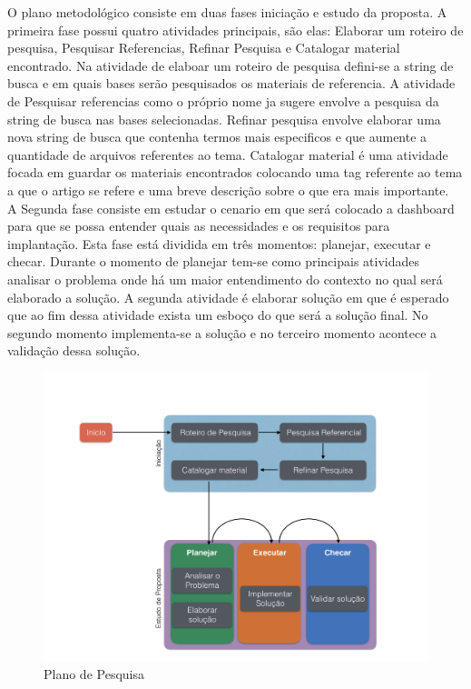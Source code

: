 O plano metodológico consiste em duas fases iniciação e estudo da proposta. A primeira fase possui quatro atividades principais, são elas: Elaborar um roteiro de pesquisa, Pesquisar Referencias, Refinar Pesquisa e Catalogar material encontrado. Na atividade de elaboar um roteiro de pesquisa defini-se a string de busca e em quais bases serão pesquisados os materiais de referencia. A atividade de Pesquisar referencias como o próprio nome ja sugere envolve a pesquisa da string de busca nas bases selecionadas. Refinar pesquisa envolve elaborar uma nova string de busca que contenha termos mais especificos e que aumente a quantidade de arquivos referentes ao tema. Catalogar material é uma atividade focada em guardar os materiais encontrados colocando uma tag referente ao tema a que o artigo se refere e uma breve descrição sobre o que era mais importante. 
\\A Segunda fase consiste em estudar o cenario em que será colocado a dashboard para que se possa entender quais as necessidades e os requisitos para implantação. Esta fase está dividida em três momentos: planejar,  executar e checar. Durante o momento de planejar tem-se como principais atividades analisar o problema onde há um maior entendimento do contexto no qual será elaborado a solução. A segunda atividade é elaborar solução em que é esperado que ao fim dessa atividade exista um esboço do que será a solução final. No segundo momento implementa-se a solução e no terceiro momento acontece a validação dessa solução.
\graphicspath{{figuras/}}
\begin{figure}
\centering
\includegraphics[scale=0.40]{TCCMetodologia}
\caption{Plano de Pesquisa}
\label{Rotulo}
\end{figure}

